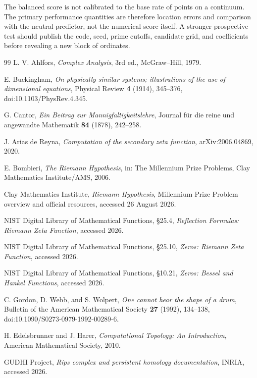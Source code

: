 \documentclass[11pt]{amsart}
\theoremstyle{definition}
\theoremstyle{remark}
\begin{document}
The balanced score is not calibrated to the base rate of points on a continuum.  The primary
performance quantities are therefore location errors and comparison with the neutral predictor,
not the numerical score itself.  A stronger prospective test should publish the code, seed,
prime cutoffs, candidate grid, and coefficients before revealing a new block of ordinates.

\begin{thebibliography}{99}
L. V. Ahlfors, \emph{Complex Analysis}, 3rd ed., McGraw--Hill, 1979.

E. Buckingham, \emph{On physically similar systems; illustrations of the use of dimensional
equations}, Physical Review \textbf{4} (1914), 345--376,
doi:10.1103/PhysRev.4.345.

G. Cantor, \emph{Ein Beitrag zur Mannigfaltigkeitslehre}, Journal f\"ur die reine und
angewandte Mathematik \textbf{84} (1878), 242--258.

J. Arias de Reyna, \emph{Computation of the secondary zeta function}, arXiv:2006.04869, 2020.

E. Bombieri, \emph{The Riemann Hypothesis}, in: The Millennium Prize Problems, Clay Mathematics Institute/AMS, 2006.

Clay Mathematics Institute, \emph{Riemann Hypothesis}, Millennium Prize Problem overview and official resources, accessed 26 August 2026.

NIST Digital Library of Mathematical Functions, \S25.4, \emph{Reflection Formulas: Riemann Zeta Function}, accessed 2026.

NIST Digital Library of Mathematical Functions, \S25.10, \emph{Zeros: Riemann Zeta Function}, accessed 2026.

NIST Digital Library of Mathematical Functions, \S10.21,
\emph{Zeros: Bessel and Hankel Functions}, accessed 2026.

C. Gordon, D. Webb, and S. Wolpert,
\emph{One cannot hear the shape of a drum},
Bulletin of the American Mathematical Society \textbf{27} (1992), 134--138,
doi:10.1090/S0273-0979-1992-00289-6.

H. Edelsbrunner and J. Harer, \emph{Computational Topology: An Introduction}, American Mathematical Society, 2010.

GUDHI Project, \emph{Rips complex and persistent homology documentation}, INRIA, accessed 2026.


\end{thebibliography}
\end{document}
